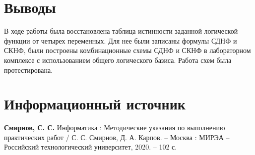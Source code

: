 \documentclass[14pt, a4paper]{extreport}
\begin{document}
\makeatletter
\setlength{\@fptop}{0pt}
\makeatother

\chapter{Выводы}
В ходе работы была восстановлена таблица истинности заданной логической функции от четырех переменных. Для нее были записаны формулы СДНФ и СКНФ, были построены комбинационные схемы СДНФ и СКНФ в лабораторном комплексе с использованием общего логического базиса. Работа схем была протестирована.

\chapter{Информационный источник}
\textbf{Смирнов, С. С.} Информатика : Методические указания по выполнению практических работ / С. С. Смирнов, Д. А. Карпов. -- Москва : МИРЭА -- Российский технологический университет, 2020. -- 102 с.
\end{document}
